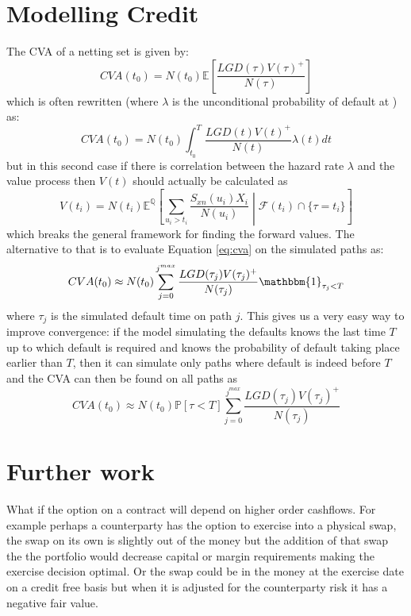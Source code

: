 \documentclass[a4paper,10pt]{article}
\newcommand{\E}{\mathbb{E}}                 %
\renewcommand{\P}{\mathbb{P}}               %
\newcommand{\Q}{\mathbb{Q}}                 %
\begin{document}
\section{Modelling Credit}
The CVA of a netting set is given by:
\begin{equation}
CVA(t_0) = N(t_0) \E \left[ \frac{LGD(\tau)V(\tau)^+}{N(\tau)}\right]
\label{eq:cva}
\end{equation}
which is often rewritten (where $\lambda$ is the unconditional probability of default at ) as:
\begin{equation}
CVA(t_0) = N(t_0) \int_{t_0}^T \frac{LGD(t)V(t)^+}{N(t)} \lambda(t) dt
\end{equation}
but in this second case if there is correlation between the hazard rate $\lambda$ and the value process then $V(t)$
should actually be calculated as 
\begin{equation}
V(t_i) = N(t_i)\E^\Q\left[ \sum_{u_i>t_i}{\frac{S_{xn}(u_i)X_i}{N(u_i)}} \middle| \mathcal{F}(t_i) \cap \{\tau=t_i\} \right]
\end{equation}
which breaks the general framework for finding the forward values.  The alternative to that is to evaluate Equation \ref{eq:cva} on the simulated paths as:
\begin{equation}
CVA(t_0) \approx N(t_0) \sum_{j=0}^{j^{max}} \frac{LGD(\tau_j)V(\tau_j)^+}{N(\tau_j)} \mathbbm{1}_{\tau_j<T}\\
\label{eq:cva2}
\end{equation}
where $\tau_j$ is the simulated default time on path $j$.  This gives us a very easy way to improve convergence: if the model simulating the defaults knows the last time $T$ up to which default is required and knows the probability of default taking place earlier than $T$, then it can simulate only paths where default is indeed before $T$ and the CVA can then be found on all paths as
\begin{equation}
CVA(t_0) \approx N(t_0) \P[\tau<T] \sum_{j=0}^{j^{max}} \frac{LGD(\tau_j)V(\tau_j)^+}{N(\tau_j)} 
\label{eq:cva3}
\end{equation}
\section{Further work}
What if the option on a contract will depend on higher order cashflows.  For example perhaps a counterparty has the option to exercise into a physical swap, the swap on its own is slightly out of the money but the addition of that swap the the portfolio would decrease capital or margin requirements making the exercise decision optimal.  Or the swap could be in the money at the exercise date on a credit free basis but when it is adjusted for the counterparty risk it has a negative fair value.
\end{document}
